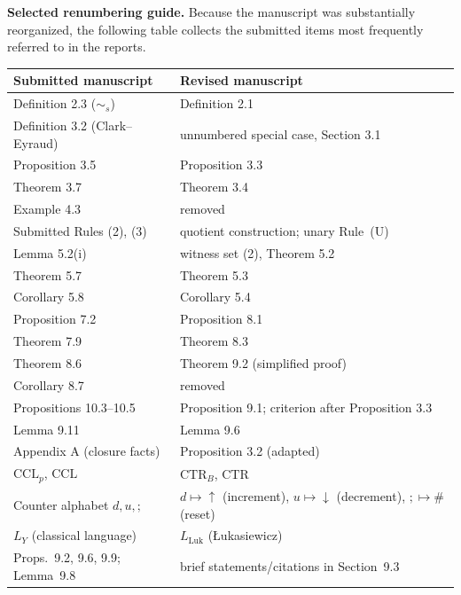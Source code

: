 \documentclass[
  10pt,
  a4paper,
]{article}
\begin{document}
\medskip
\noindent\textbf{Selected renumbering guide.}
Because the manuscript was substantially reorganized, the following table
collects the submitted items most frequently referred to in the reports.
\begin{center}
\begin{tabular}{@{}ll@{}}
\toprule
Submitted manuscript & Revised manuscript \\
\midrule
Definition 2.3 ($\sim_s$) & Definition 2.1 \\
Definition 3.2 (Clark--Eyraud) & unnumbered special case, Section 3.1 \\
Proposition 3.5 & Proposition 3.3 \\
Theorem 3.7 & Theorem 3.4 \\
Example 4.3 & removed \\
Submitted Rules (2), (3) & quotient construction; unary Rule~\textup{(U)} \\
Lemma 5.2(i) & witness set (2), Theorem 5.2 \\
Theorem 5.7 & Theorem 5.3 \\
Corollary 5.8 & Corollary 5.4 \\
Proposition 7.2 & Proposition 8.1 \\
Theorem 7.9 & Theorem 8.3 \\
Theorem 8.6 & Theorem 9.2 (simplified proof) \\
Corollary 8.7 & removed \\
Propositions 10.3--10.5 & Proposition 9.1; criterion after Proposition 3.3 \\
Lemma 9.11 & Lemma 9.6 \\
Appendix A (closure facts) & Proposition 3.2 (adapted) \\
$\mathrm{CCL}_{p}$, $\mathrm{CCL}$ & $\mathrm{CTR}_{B}$, $\mathrm{CTR}$ \\
Counter alphabet $d,u,;$ & $d\mapsto\uparrow$ (increment), $u\mapsto\downarrow$ (decrement), $;\mapsto\#$ (reset) \\
$L_Y$ (classical language) & $L_{\mathrm{Luk}}$ (\L{}ukasiewicz) \\
Props.~9.2, 9.6, 9.9; Lemma~9.8 & brief statements/citations in Section~9.3 \\
\bottomrule
\end{tabular}
\end{center}
\end{document}

